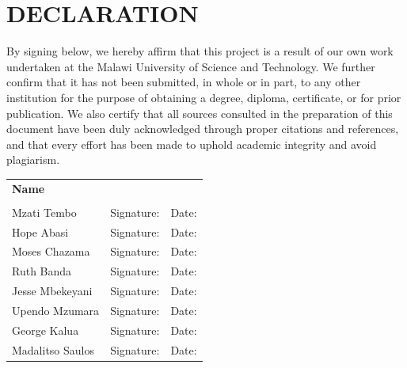 \documentclass[12pt,a4paper]{report}
\begin{document}
\newpage
\chapter*{DECLARATION}

By signing below, we hereby affirm that this project is a result of our own work undertaken at the Malawi University of Science and Technology. We further confirm that it has not been submitted, in whole or in part, to any other institution for the purpose of obtaining a degree, diploma, certificate, or for prior publication. We also certify that all sources consulted in the preparation of this document have been duly acknowledged through proper citations and references, and that every effort has been made to uphold academic integrity and avoid plagiarism.

\vspace{1.5cm}

\noindent
\begin{tabular}{p{5cm} p{5cm} p{5cm}}
\textbf{Name} & & \\
\\
Mzati Tembo      & Signature: \underline{\hspace{3cm}} & Date: \underline{\hspace{2cm}} \\[1.2cm]
 Hope Abasi       & Signature: \underline{\hspace{3cm}} & Date: \underline{\hspace{2cm}} \\[1.2cm]
 Moses Chazama    & Signature: \underline{\hspace{3cm}} & Date: \underline{\hspace{2cm}} \\[1.2cm]
 Ruth Banda       & Signature: \underline{\hspace{3cm}} & Date: \underline{\hspace{2cm}} \\[1.2cm]
 Jesse Mbekeyani  & Signature: \underline{\hspace{3cm}} & Date: \underline{\hspace{2cm}} \\[1.2cm]
 Upendo Mzumara   & Signature: \underline{\hspace{3cm}} & Date: \underline{\hspace{2cm}} \\[1.2cm]
 George Kalua     & Signature: \underline{\hspace{3cm}} & Date: \underline{\hspace{2cm}} \\[1.2cm]
 Madalitso Saulos & Signature: \underline{\hspace{3cm}} & Date: \underline{\hspace{2cm}} \\[1.2cm]
\end{tabular}
\end{document}
